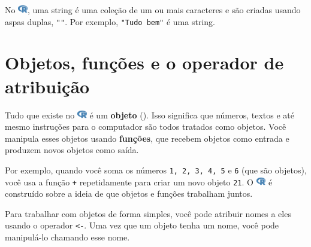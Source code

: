 \documentclass[
  letterpaper,
]{book}
\theoremstyle{definition}
\theoremstyle{plain}
\theoremstyle{remark}
\begin{document}
\begin{tcolorbox}[enhanced jigsaw, colback=white, bottomrule=.15mm, colframe=quarto-callout-note-color-frame, rightrule=.15mm, opacityback=0, toptitle=1mm, arc=.35mm, toprule=.15mm, bottomtitle=1mm, titlerule=0mm, opacitybacktitle=0.6, leftrule=.75mm, colbacktitle=quarto-callout-note-color!10!white, coltitle=black, title=\textcolor{quarto-callout-note-color}{\faInfo}\hspace{0.5em}{Nota}, breakable, left=2mm]

No
\includegraphics[width=1.13em,height=1em]{getting_started_with_r_files/figure-pdf/fa-icon-9b00320707d42527dde67262afb33ded.pdf},
uma string é uma coleção de um ou mais caracteres e são criadas usando
aspas duplas, \texttt{""}. Por exemplo, \texttt{"Tudo\ bem"} é uma
string.

\end{tcolorbox}

\section{Objetos, funções e o operador de
atribuição}\label{objetos-funuxe7uxf5es-e-o-operador-de-atribuiuxe7uxe3o}

Tudo que existe no
\includegraphics[width=1.13em,height=1em]{getting_started_with_r_files/figure-pdf/fa-icon-9b00320707d42527dde67262afb33ded.pdf}
é um \textbf{objeto}
(). Isso
significa que números, textos e até mesmo instruções para o computador
são todos tratados como objetos. Você manipula esses objetos usando
\textbf{funções}, que recebem objetos como entrada e produzem novos
objetos como saída.

Por exemplo, quando você soma os números \texttt{1,\ 2,\ 3,\ 4,\ 5} e
\texttt{6} (que são objetos), você usa a função \texttt{+} repetidamente
para criar um novo objeto \texttt{21}. O
\includegraphics[width=1.13em,height=1em]{getting_started_with_r_files/figure-pdf/fa-icon-9b00320707d42527dde67262afb33ded.pdf}
é construído sobre a ideia de que objetos e funções trabalham juntos.

Para trabalhar com objetos de forma simples, você pode atribuir nomes a
eles usando o operador \texttt{\textless{}-}. Uma vez que um objeto
tenha um nome, você pode manipulá-lo chamando esse nome.
\end{document}
